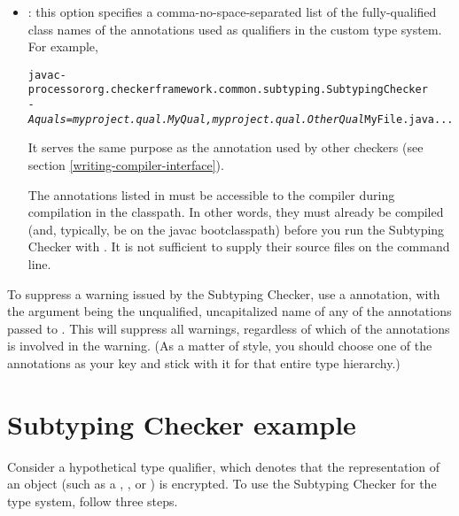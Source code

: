\begin{itemize}

\item
{}: this option specifies a comma-no-space-separated list of
the fully-qualified class
names of the annotations used as qualifiers in the custom type system.  For
example,

\begin{alltt}
  javac -processor org.checkerframework.common.subtyping.SubtypingChecker
        \textit{-Aquals=myproject.qual.MyQual,myproject.qual.OtherQual} MyFile.java ...
\end{alltt}

It serves the same purpose as the 
annotation used by other checkers (see section
\ref{writing-compiler-interface}).

The annotations listed in  must be accessible to
the compiler during compilation in the classpath.  In other words, they must
already be compiled (and, typically, be on the javac bootclasspath)
before you run the Subtyping Checker with .  It
is not sufficient to supply their source files on the command line.

\end{itemize}

To suppress a warning issued by the Subtyping Checker, use a
annotation, with the argument being the unqualified, uncapitalized name of
any of the annotations passed to .  This will suppress all
warnings, regardless of which of the annotations is involved in the
warning.  (As a matter of style, you should choose one of the annotations
as your  key and stick with it for that entire type
hierarchy.)


\section{Subtyping Checker example\label{subtyping-example}\label{encrypted-example}}

Consider a hypothetical  type qualifier, which denotes that the
representation of an object (such as a , , or
) is encrypted. To use the Subtyping Checker for the 
type system, follow three steps.

